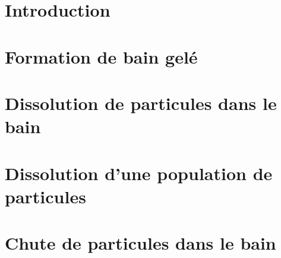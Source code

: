 \section{Introduction}
\label{sec:particle-introduction}


\section{Formation de bain gelé}
\label{sec:particle-freeze}


\section{Dissolution de particules dans le bain}
\label{sec-particle-dissolution}


\section{Dissolution d'une population de particules}
\label{sec:particle-population-dissolution}


\section{Chute de particules dans le bain}
\label{sec:particle-fall}

